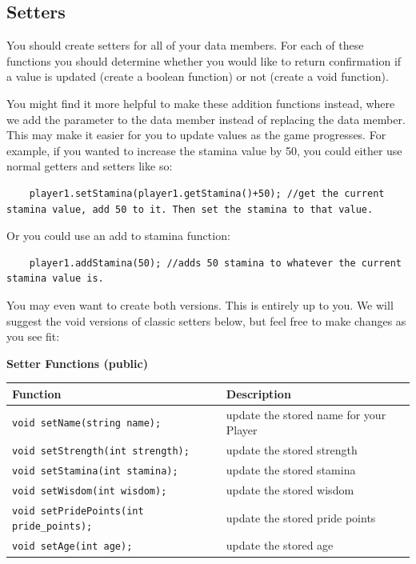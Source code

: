 \subsection{Setters}

You should create setters for all of your data members. For each of these functions you should determine whether you would like to return confirmation if a value is updated (create a boolean function) or not (create a void function). 

You might find it more helpful to make these addition functions instead, where we add the parameter to the data member instead of replacing the data member. This may make it easier for you to update values as the game progresses. For example, if you wanted to increase the stamina value by 50, you could either use normal getters and setters like so:

\begin{verbatim}
    player1.setStamina(player1.getStamina()+50); //get the current stamina value, add 50 to it. Then set the stamina to that value.
\end{verbatim}

Or you could use an add to stamina function:

\begin{verbatim}
    player1.addStamina(50); //adds 50 stamina to whatever the current stamina value is.
\end{verbatim}

You may even want to create both versions. This is entirely up to you. We will suggest the void versions of classic setters below, but feel free to make changes as you see fit:

\textbf{Setter Functions (public)}

\renewcommand{\arraystretch}{1.5} 
\begin{longtable}{|p{3.0in}|p{3.0in}|}
\hline
\textbf{Function} & \textbf{Description} \\ \hline
\texttt{void setName(string name);} & update the stored name for your Player \\ \hline
\texttt{void setStrength(int strength);} & update the stored strength \\ \hline
\texttt{void setStamina(int stamina);} & update the stored stamina \\ \hline
\texttt{void setWisdom(int wisdom);} & update the stored wisdom\\ \hline
\texttt{void setPridePoints(int pride_points);} & update the stored pride points \\ \hline
\texttt{void setAge(int age);} & update the stored age \\ \hline
\end{longtable}

